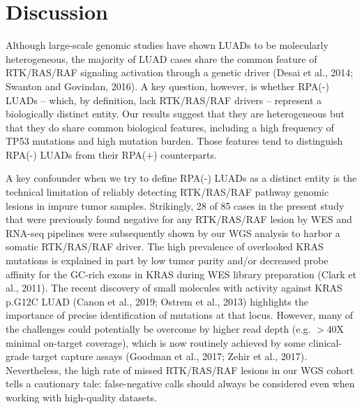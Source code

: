 \documentclass[phd,tocprelim]{cornell}
\begin{document}
\section{Discussion}
Although large-scale genomic studies have shown LUADs to be molecularly heterogeneous, the majority of LUAD cases share the common feature of RTK/RAS/RAF signaling activation through a genetic driver (Desai et al., 2014; Swanton and Govindan, 2016). A key question, however, is whether RPA(-) LUADs – which, by definition, lack RTK/RAS/RAF drivers – represent a biologically distinct entity. Our results suggest that they are heterogeneous but that they do share common biological features, including a high frequency of TP53 mutations and high mutation burden. Those features tend to distinguish RPA(-) LUADs from their RPA(+) counterparts.  

A key confounder when we try to define RPA(-) LUADs as a distinct entity is the technical limitation of reliably detecting RTK/RAS/RAF pathway genomic lesions in impure tumor samples. Strikingly, 28 of 85 cases in the present study that were previously found negative for any RTK/RAS/RAF lesion by WES and RNA-seq pipelines were subsequently shown by our WGS analysis to harbor a somatic RTK/RAS/RAF driver. The high prevalence of overlooked KRAS mutations is explained in part by low tumor purity and/or decreased probe affinity for the GC-rich exons in KRAS during WES library preparation (Clark et al., 2011). The recent discovery of small molecules with activity against KRAS p.G12C LUAD (Canon et al., 2019; Ostrem et al., 2013) highlights the importance of precise identification of mutations at that locus. However, many of the challenges could potentially be overcome by higher read depth (e.g. $>$40X minimal on-target coverage), which is now routinely achieved by some clinical-grade target capture assays (Goodman et al., 2017; Zehir et al., 2017). Nevertheless, the high rate of missed RTK/RAS/RAF lesions in our WGS cohort tells a cautionary tale: false-negative calls should always be considered even when working with high-quality datasets. 
\end{document}
